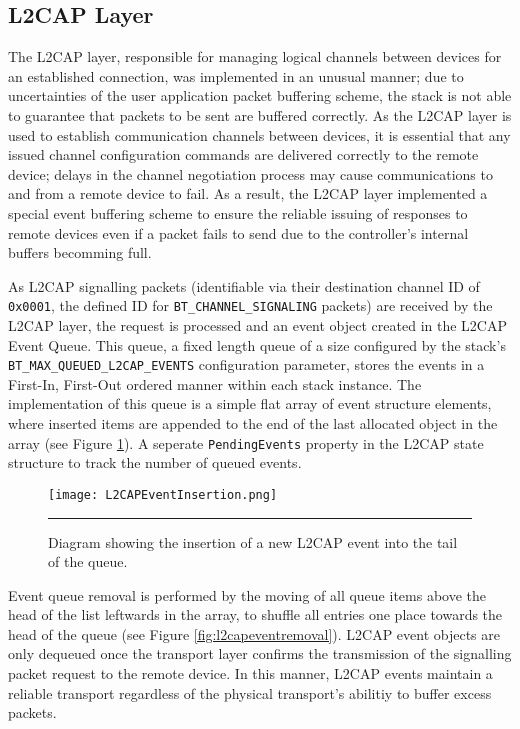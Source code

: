 \FloatBarrier
\subsection{L2CAP Layer}

The L2CAP layer, responsible for managing logical channels between devices for an established connection, was implemented in an unusual manner; due to uncertainties of the user application packet buffering scheme, the stack is not able to guarantee that packets to be sent are buffered correctly. As the L2CAP layer is used to establish communication channels between devices, it is essential that any issued channel configuration commands are delivered correctly to the remote device; delays in the channel negotiation process may cause communications to and from a remote device to fail. As a result, the L2CAP layer implemented a special event buffering scheme to ensure the reliable issuing of responses to remote devices even if a packet fails to send due to the controller's internal buffers becomming full.

As L2CAP signalling packets (identifiable via their destination channel ID of \texttt{0x0001}, the defined ID for \lstinline{BT_CHANNEL_SIGNALING} packets) are received by the L2CAP layer, the request is processed and an event object created in the L2CAP Event Queue. This queue, a fixed length queue of a size configured by the stack's \lstinline{BT_MAX_QUEUED_L2CAP_EVENTS} configuration parameter, stores the events in a First-In, First-Out ordered manner within each stack instance. The implementation of this queue is a simple flat array of event structure elements, where inserted items are appended to the end of the last allocated object in the array (see Figure \ref{fig:l2capeventinsertion}). A seperate \lstinline{PendingEvents} property in the L2CAP state structure to track the number of queued events.

\begin{figure}[tbph]
	\vspace{1em}
	\centering
		\texttt{[image: L2CAPEventInsertion.png]}
	\rule{35em}{0.5pt}
	\caption[L2CAP Event Object Queue Insertion]{Diagram showing the insertion of a new L2CAP event into the tail of the queue.}
	\label{fig:l2capeventinsertion}
\end{figure}

Event queue removal is performed by the moving of all queue items above the head of the list leftwards in the array, to shuffle all entries one place towards the head of the queue (see Figure \ref{fig:l2capeventremoval}). L2CAP event objects are only dequeued once the transport layer confirms the transmission of the signalling packet request to the remote device. In this manner, L2CAP events maintain a reliable transport regardless of the physical transport's abilitiy to buffer excess packets.

